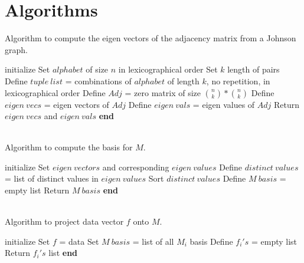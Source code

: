 \documentclass{article}
\theoremstyle{remark}
\theoremstyle{definition}
\begin{document}
\section{Algorithms}
    Algorithm to compute the eigen vectors of the adjacency matrix from a Johnson graph. \\
    \begin{algorithm}[H]
        \SetAlgoLined
        initialize\;
        Set $alphabet$ of size $n$ in lexicographical order\;
        Set $k$ length of pairs\;
        Define $tuple\ list$ = combinations of $alphabet$ of length $k$, no repetition, in lexicographical order\;
        Define $Adj$ = zero matrix of size $\binom{n}{k}*\binom{n}{k}$\;
        {
            {
            }
        }
        Define $eigen\ vecs$ = eigen vectors of $Adj$\;
        Define $eigen\ vals$ = eigen values of $Adj$\;
        Return $eigen\ vecs$ and $eigen\ vals$\;
        \textbf{end} 
    \end{algorithm} \\
    \vspace{2mm}
    Algorithm to compute the basis for $M$. \\
    \begin{algorithm}[H]
        \SetAlgoLined
        initialize\;
        Set $eigen\ vectors$ and corresponding $eigen\ values$\;
        Define $distinct\ values$ = list of distinct values in $eigen\ values$ \;
        Sort $distinct\ values$\;
        Define $M\ basis$ = empty list \;
        Return $M\ basis$\;
        \textbf{end}
    \end{algorithm} \\
    \vspace{2mm}
    Algorithm to project data vector $f$ onto $M$.\\
    \begin{algorithm}[H]
        \SetAlgoLined
        initialize\;
        Set $f$ = data\;
        Set $M\ basis$ = list of all $M_i$ basis\;
        Define $f_i's$ = empty list\;
        Return $f_i's$ list\;
        \textbf{end}
    \end{algorithm}
    \vspace{2mm}
\end{document}
